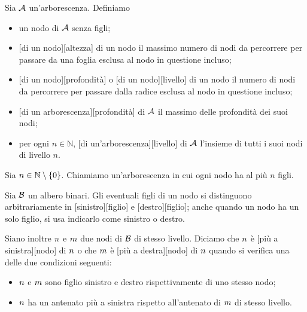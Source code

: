 \begin{Definition}
  Sia $\mathcal{A}$ un'arborescenza. Definiamo
  \begin{itemize}
    \item {} un nodo di $\mathcal{A}$ senza figli;
		\item {}[di un nodo][altezza] di un nodo il massimo numero di
      nodi da percorrere per passare da una foglia esclusa al nodo in questione
      incluso;
		\item {}[di un nodo][profondit\`a] o
      [di un nodo][livello] di un nodo il numero di
      nodi da percorrere per passare dalla radice esclusa al nodo in questione
      incluso;
    \item {}[di un arborescenza][profondit\`a] di
      $\mathcal{A}$ il massimo delle profondit\`a dei suoi nodi;
    \item per ogni $n \in \mathbb{N}$,
      [di un'arborescenza][livello] di $\mathcal{A}$
      l'insieme di tutti i suoi nodi di livello $n$.
	\end{itemize}
\end{Definition}
\begin{Definition}
  Sia $n \in \mathbb{N} \setminus \lbrace 0 \rbrace$. Chiamiamo 
  un'arborescenza in cui ogni nodo ha al pi\`u $n$ figli.
\end{Definition}
\begin{Definition}
  Sia $\mathcal{B}$ un albero binari. Gli eventuali figli di un nodo si
  distinguono arbitrariamente in
  [sinistro][figlio]
  e
  [destro][figlio]; anche quando un nodo ha un solo
  figlio, si usa indicarlo come sinistro o destro.
  \par Siano inoltre $n$ e $m$ due nodi di $\mathcal{B}$ di stesso
  livello. Diciamo che $n$ \`e
  [pi\`u a sinistra][nodo]
  di $n$
  o che $m$ \`e
  [pi\`u a destra][nodo]
  di $n$ quando si verifica una delle due condizioni seguenti:
  \begin{itemize}
    \item $n$ e $m$ sono figlio sinistro e destro rispettivamente di
      uno stesso nodo;
    \item $n$ ha un antenato pi\`u a sinistra rispetto all'antenato di
      $m$ di stesso livello.
  \end{itemize}
\end{Definition}
